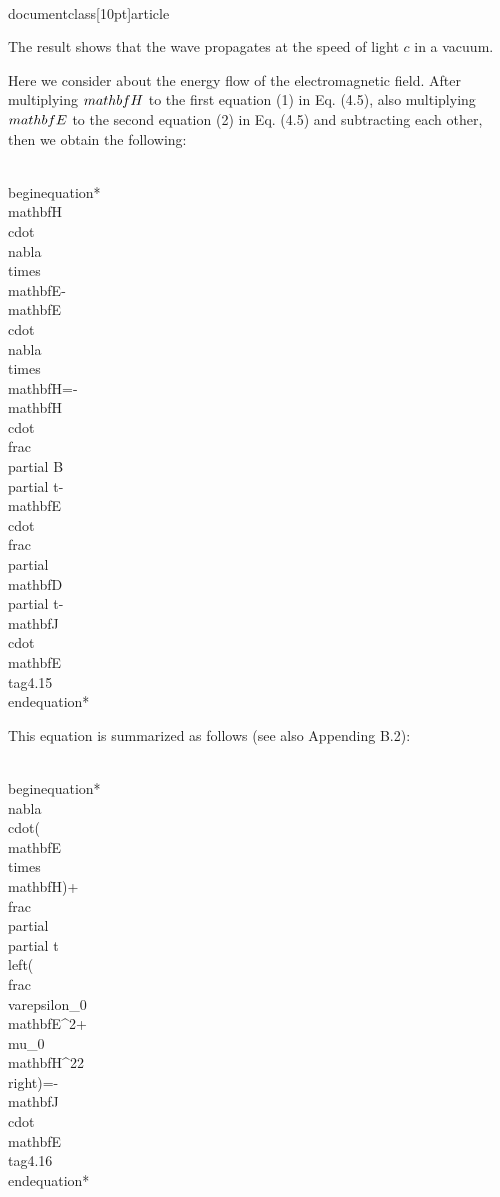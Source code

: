 \\documentclass[10pt]{article}
\begin{document}
The result shows that the wave propagates at the speed of light $c$ in a vacuum.

Here we consider about the energy flow of the electromagnetic field. After multiplying $\\mathbf{H}$ to the first equation (1) in Eq. (4.5), also multiplying $\\mathbf{E}$ to the second equation (2) in Eq. (4.5) and subtracting each other, then we obtain the following:


\\begin{equation*}
\\mathbf{H} \\cdot \\nabla \\times \\mathbf{E}-\\mathbf{E} \\cdot \\nabla \\times \\mathbf{H}=-\\mathbf{H} \\cdot \\frac{\\partial B}{\\partial t}-\\mathbf{E} \\cdot \\frac{\\partial \\mathbf{D}}{\\partial t}-\\mathbf{J} \\cdot \\mathbf{E} \\tag{4.15}
\\end{equation*}


This equation is summarized as follows (see also Appending B.2):


\\begin{equation*}
\\nabla \\cdot(\\mathbf{E} \\times \\mathbf{H})+\\frac{\\partial}{\\partial t}\\left(\\frac{\\varepsilon_{0} \\mathbf{E}^{2}+\\mu_{0} \\mathbf{H}^{2}}{2}\\right)=-\\mathbf{J} \\cdot \\mathbf{E} \\tag{4.16}
\\end{equation*}
\end{document}
